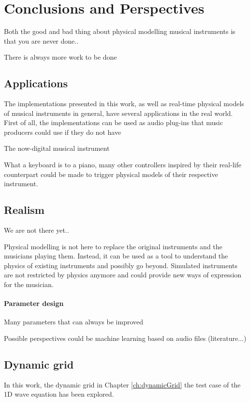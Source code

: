 \chapter{Conclusions and Perspectives}\label{ch:conclusion}
Both the good and bad thing about physical modelling musical instruments is that you are never done..

There is always more work to be done

\section{Applications}
The implementations presented in this work, as well as real-time physical models of musical instruments in general, have several applications in the real world. First of all, the implementations can be used as audio plug-ins that music producers could use if they do not have


The now-digital musical instrument 

What a keyboard is to a piano, many other controllers inspired by their real-life counterpart could be made to trigger physical models of their respective instrument.

\section{Realism}
We are not there yet.. 

Physical modelling is not here to replace the original instruments and the musicians playing them. Instead, it can be used as a tool to understand the physics of existing instruments and possibly go beyond. Simulated instruments are not restricted by physics anymore and could provide new ways of expression for the musician. 

\subsubsection{Parameter design}
Many parameters that can always be improved

Possible perspectives could be machine learning based on audio files (literature...)

\section{Dynamic grid}
In this work, the dynamic grid in Chapter \ref{ch:dynamicGrid} the test case of the 1D wave equation has been explored. 